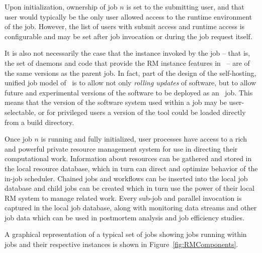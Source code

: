 Upon initialization, ownership of job $n$ is set to the submitting
user, and that user would typically be the only user allowed
access to the runtime environment of the job. However, the list
of users with submit access and runtime access is configurable
and may be set after job invocation or during the job request
itself.

It is also not necessarily the case that the instance invoked by
the job --  that is, the set of daemons and code that provide the
RM instance features in \ngrm\ -- are of the same versions as the
parent job. In fact, part of the design of the self-hosting, unified
job model of \ngrm\ is to allow not only \emph{rolling updates}
of software, but to allow future and experimental versions of the
software to be deployed as an \ngrm\ job. This means that
the version of the software system used within a job may be
user-selectable, or for privileged users a version of the
tool could be loaded directly from a build directory.
\ifcomments
{}
\fi

Once job $n$ is running and fully initialized, user processes
have access to a rich and powerful private resource management system
for use in directing  their computational work. Information
about resources can be gathered and stored in the local
resource database, which in turn can direct and optimize
behavior of the in-job scheduler. Chained jobs and workflows
can be inserted into the local job database and child jobs can
be created which in turn use the power of their local RM system
to manage related work. Every sub-job and parallel invocation
is captured in the local job database, along with monitoring
data streams and other job data which can be used in postmortem
analysis and job efficiency studies.

A graphical representation of a typical set of jobs showing
jobs running within jobs and their respective instances is
shown in Figure~\ref{fig:RMComponents}.

